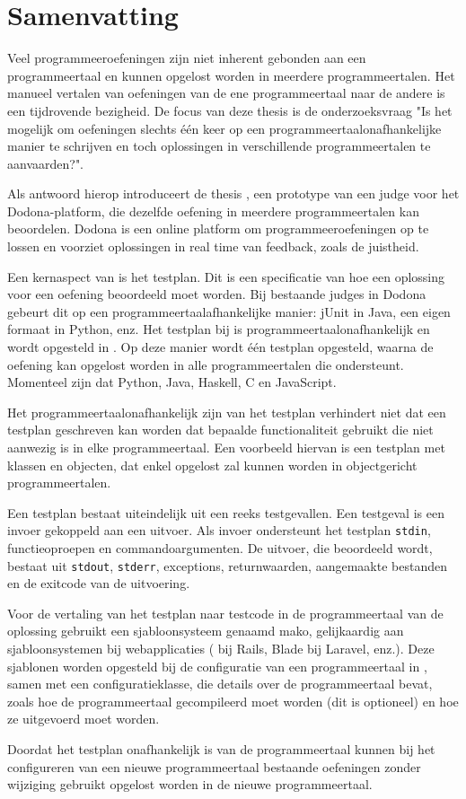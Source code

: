 \chapter*{Samenvatting}

Veel programmeeroefeningen zijn niet inherent gebonden aan een programmeertaal en kunnen opgelost worden in meerdere programmeertalen.
Het manueel vertalen van oefeningen van de ene programmeertaal naar de andere is een tijdrovende bezigheid.
De focus van deze thesis is de onderzoeksvraag "Is het mogelijk om oefeningen slechts één keer op een programmeertaalonafhankelijke manier te schrijven en toch oplossingen in verschillende programmeertalen te aanvaarden?".

Als antwoord hierop introduceert de thesis \tested{}, een prototype van een judge voor het Dodona-platform, die dezelfde oefening in meerdere programmeertalen kan beoordelen.
Dodona is een online platform om programmeeroefeningen op te lossen en voorziet oplossingen in real time van feedback, zoals de juistheid.

Een kernaspect van \tested{} is het testplan.
Dit is een specificatie van hoe een oplossing voor een oefening beoordeeld moet worden.
Bij bestaande judges in Dodona gebeurt dit op een programmeertaalafhankelijke manier: jUnit in Java, een eigen formaat in Python, enz.
Het testplan bij \tested{} is programmeertaalonafhankelijk en wordt opgesteld in .
Op deze manier wordt één testplan opgesteld, waarna de oefening kan opgelost worden in alle programmeertalen die \tested{} ondersteunt.
Momenteel zijn dat Python, Java, Haskell, C en JavaScript.

Het programmeertaalonafhankelijk zijn van het testplan verhindert niet dat een testplan geschreven kan worden dat bepaalde functionaliteit gebruikt die niet aanwezig is in elke programmeertaal.
Een voorbeeld hiervan is een testplan met klassen en objecten, dat enkel opgelost zal kunnen worden in objectgericht programmeertalen.

Een testplan bestaat uiteindelijk uit een reeks testgevallen.
Een testgeval is een invoer gekoppeld aan een uitvoer.
Als invoer ondersteunt het testplan \texttt{stdin}, functieoproepen en commandoargumenten.
De uitvoer, die beoordeeld wordt, bestaat uit \texttt{stdout}, \texttt{stderr}, exceptions, returnwaarden, aangemaakte bestanden en de exitcode van de uitvoering.

Voor de vertaling van het testplan naar testcode in de programmeertaal van de oplossing gebruikt \tested{} een sjabloonsysteem genaamd mako, gelijkaardig aan sjabloonsystemen bij webapplicaties ( bij Rails, Blade bij Laravel, enz.).
Deze sjablonen worden opgesteld bij de configuratie van een programmeertaal in \tested{}, samen met een configuratieklasse, die details over de programmeertaal bevat, zoals hoe de programmeertaal gecompileerd moet worden (dit is optioneel) en hoe ze uitgevoerd moet worden.

Doordat het testplan onafhankelijk is van de programmeertaal kunnen bij het configureren van een nieuwe programmeertaal bestaande oefeningen zonder wijziging gebruikt opgelost worden in de nieuwe programmeertaal.
